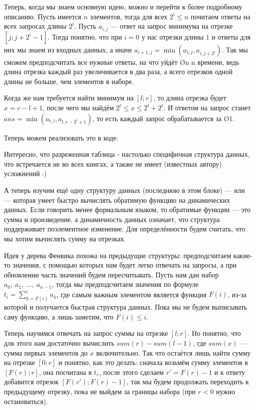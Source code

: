 {Теперь, когда мы знаем основную идею, можно и перейти к более подробному описанию. Пусть имеется $n$ элементов, тогда для всех $2^i \leq n$ почитаем ответы на всех запросах длины $2^i$. Пусть $a_{i, j}$ — ответ на запрос минимума на отрезке $[j; j + 2^i - 1]$. Тогда понятно, что при $i = 0$ у нас отрезки длины $1$ и ответы для них мы знаем из входных данных, а иначе $a_{i + 1, j} = \min( a_{i, j}, a_{i, j + 2^i} )$. Так мы сможем предподсчитать все нужные ответы, на что уйдёт \O{n \log n} времени, ведь длина отрезка каждый раз увеличивается в два раза, а всего отрезков одной длины не больше, чем элементов в наборе.

Когда же нам требуется найти минимум на $[l; r]$, то длина отрезка будет $x = r - l + 1$, после чего мы найдём $2^t \leq x \leq 2^t + 2^t$. И ответом на запрос станет $ans = \min( a_{t, l} ,  a_{t, r - 2^t + 1} )$, то есть каждый запрос обрабатывается за \O{1}.

Теперь можем реализовать это в коде:


Интересно, что разреженная таблица - настолько специфичная структура данных, что встречается не во всех книгах, а также не имеет (известных автору) усложнений :)


А теперь изучим ещё одну структуру данных (последнюю в этом блоке) —  или  — которая умеет быстро вычислять обратимую функцию на динамических данных. Если говорить менее формальным языком, то обратимые функции — это сумма и произведение, а динамичность данных означает, что структура поддерживает поэлементное изменение. Для определённости будем считать, что мы хотим вычислять сумму на отрезках.

Идея у дерева Фенвика похожа на предыдущие структуры: предподсчитаем какие-то значения, с помощью которых нам будет легко отвечать на запросы, а при обновлении часть значений будем пересчитывать. Пусть нам дан набор $a_0,\ a_1,\ \ldots,\ a_{n - 1}$, тогда мы предподсчитаем значения по формуле $t_i = \sum\limits_{k=F(i)}^{i} a_k$, где самым важным элементом является функция $F(i)$, из-за которой и получается быстрая структура данных. Пока мы не будем выписывать саму функцию, а лишь заметим, что $F(i) \leq i$.

Теперь научимся отвечать на запрос суммы на отрезке $[l;r]$. Но понятно, что для этого нам достаточно вычислить $sum(r) - sum(l - 1)$, где $sum(x)$ — сумма первых элементов до $x$ включительно. Так что остаётся лишь найти сумму на отрезке $[0; r]$ и понятно, как это делать: сначала возьмём сумму элементов в $[F(r); r]$, она посчитана в $t_r$, после этого сделаем $r' = F(r) - 1$ и к ответу добавится отрезок $[F(r'); F(r) - 1]$, так мы будем продолжать переходить к предыдущему отрезку, пока не выйдем за границы набора (при $r < 0$ нужно остановиться).

}
